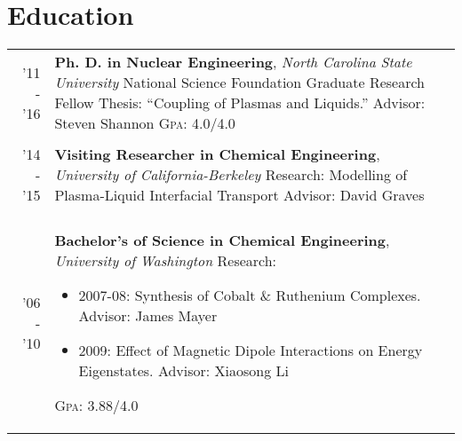 \documentclass[a4paper,10pt]{article} %
\begin{document}
\section{Education}

\begin{table}[H]
\begin{tabularx}{\textwidth}{r>{\raggedright\arraybackslash}X}

  \textsc{'11 - '16} & \textbf{Ph. D. in Nuclear Engineering}, \textit{North Carolina State University}\newline
  National Science Foundation Graduate Research Fellow\newline
  Thesis: ``Coupling of Plasmas and Liquids.''\newline
  Advisor: Steven Shannon\newline
  \textsc{Gpa}: 4.0/4.0\\
&\\


  \textsc{'14 - '15} & \textbf{Visiting Researcher in Chemical Engineering}, \textit{University of California-Berkeley}\newline
  Research: Modelling of Plasma-Liquid Interfacial Transport\newline
  Advisor: David Graves\\
&\\


  \textsc{'06 - '10} & \textbf{Bachelor's of Science in Chemical Engineering}, \textit{University of Washington}\newline
  Research:
  \begin{itemize}
  \item 2007-08: Synthesis of Cobalt \& Ruthenium Complexes. Advisor: James Mayer
  \item 2009: Effect of Magnetic Dipole Interactions on Energy Eigenstates. Advisor: Xiaosong Li
  \end{itemize}
  \textsc{Gpa}: 3.88/4.0\\

\end{tabularx}
\end{table}

\end{document}

